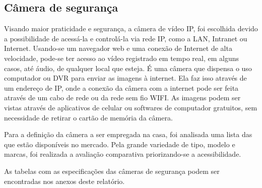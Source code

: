 \subsection{Câmera de segurança}
\par Visando maior praticidade e segurança, a câmera de vídeo IP, foi escolhida devido a possibilidade de acessá-la e controlá-la via rede IP, como a LAN, Intranet ou Internet. Usando-se um navegador web e uma conexão de Internet de alta velocidade, pode-se ter acesso ao vídeo registrado em tempo real, em alguns casos, até áudio, de qualquer local que esteja. É uma câmera que dispensa o uso computador ou DVR para enviar as imagens à internet. Ela faz isso através de um endereço de IP, onde a conexão da câmera com a internet pode ser feita através de um cabo de rede ou da rede sem fio WIFI. As imagens podem ser vistas através de aplicativos de celular ou softwares de computador gratuitos, sem necessidade de retirar o cartão de memória da câmera.
\par Para a definição da câmera a ser empregada na casa, foi analisada uma lista das que estão disponíveis no mercado. Pela grande variedade de tipo, modelo e marcas, foi realizada a avaliação comparativa priorizando-se a acessibilidade.
\par As tabelas com as especificações das câmeras de segurança podem ser encontradas nos anexos deste relatório.

